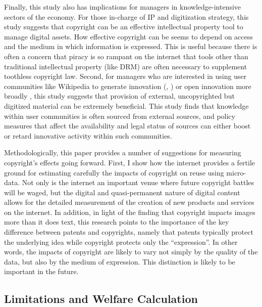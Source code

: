 \documentclass[11pt]{article}
\begin{document}
Finally, this study also has implications for managers in knowledge-intensive sectors of the economy. For those in-charge of IP and digitization strategy, this study suggests that copyright can be an effective intellectual property tool to manage digital assets. How effective copyright can be seems to depend on access and the medium in which information is expressed. This is useful because there is often a concern that piracy is so rampant on the internet that tools other than traditional intellectual property (like DRM) are often necessary \citep{zhang_intellectual_2014} to supplement toothless copyright law. Second, for managers who are interested in using user communities like Wikipedia to generate innovation (\cite{boudreau_incentives_2011}, \cite{franzoni_crowd_2014}) or open innovation more broadly \citep{fleming_brokerage_2007}, this study suggests that provision of external, uncopyrighted but digitized material can be extremely beneficial. This study finds that knowledge within user communities is often sourced from external sources, and policy measures that affect the availability and legal status of sources can either boost or retard innovative activity within such communities. 

Methodologically, this paper provides a number of suggestions for measuring copyright's effects going forward. First, I show how the internet provides a fertile ground for estimating carefully the impacts of copyright on reuse using micro-data. Not only is the internet an important venue where future copyright battles will be waged, but the digital and quasi-permanent nature of digital content allows for the detailed measurement of the creation of new products and services on the internet. In addition, in light of the finding that copyright impacts images more than it does text, this research points to the importance of the key difference between patents and copyrights, namely that patents typically protect the underlying idea while copyright protects only the ``expression''. In other words, the impacts of copyright are likely to vary not simply by the quality of the data, but also by the medium of expression. This distinction is likely to be important in the future. 

\subsection{Limitations and Welfare Calculation}

\end{document}
